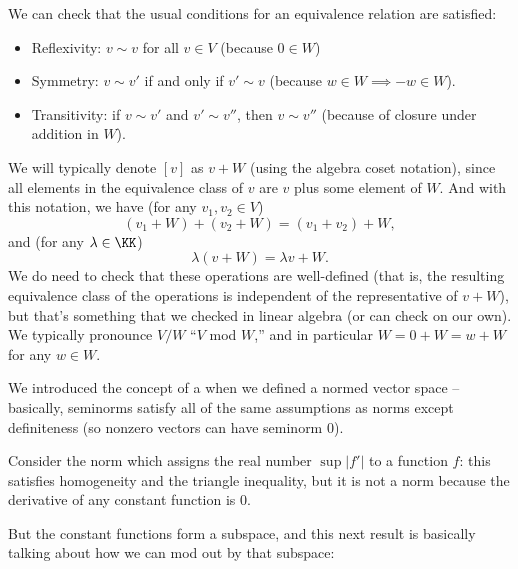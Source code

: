 We can check that the usual conditions for an equivalence relation are satisfied:

\begin{itemize}
    \item Reflexivity: $v \sim v$ for all $v \in V$ (because $0 \in W$)
    \item Symmetry: $v \sim v'$ if and only if $v' \sim v$ (because $w \in W \implies -w \in W$).
    \item Transitivity: if $v \sim v'$ and $v' \sim v''$, then $v \sim v''$ (because of closure under addition in $W$).
\end{itemize}

We will typically denote $[v]$ as $v + W$ (using the algebra coset notation), since all elements in the equivalence class of $v$ are $v$ plus some element of $W$. And with this notation, we have (for any $v_1, v_2 \in V$)
\[
    (v_1 + W) + (v_2 + W) = (v_1 + v_2) + W,
\]
and (for any $\lambda \in \KK$)
\[
    \lambda(v + W) = \lambda v + W.
\]
We do need to check that these operations are well-defined (that is, the resulting equivalence class of the operations is independent of the representative of $v + W$), but that's something that we checked in linear algebra (or can check on our own). We typically pronounce $V/W$ ``$V$ mod $W$,'' and in particular $W = 0 + W = w + W$ for any $w \in W$.

We introduced the concept of a  when we defined a normed vector space -- basically, seminorms satisfy all of the same assumptions as norms except definiteness (so nonzero vectors can have seminorm $0$). 

\begin{example}
Consider the norm which assigns the real number $\sup |f'|$ to a function $f$: this satisfies homogeneity and the triangle inequality, but it is not a norm because the derivative of any constant function is $0$. 
\end{example}

But the constant functions form a subspace, and this next result is basically talking about how we can mod out by that subspace:

